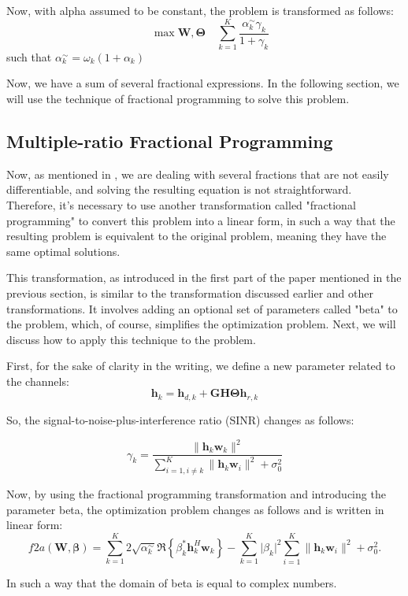 \documentclass{article}
\begin{document}
Now, with alpha assumed to be constant, the problem is 
transformed as follows:
\[
\quad \max \mathbf{W}, \boldsymbol{\Theta} \quad \sum_{k=1}^{K} \frac{\alpha_k^\sim \gamma_k}{1 + \gamma_k}
\]
such that $\alpha_k^\sim = \omega_k(1 + \alpha_k)$

Now, we have a sum of several fractional expressions. In the following section, we will use the technique of fractional programming to solve this problem.

\subsection{Multiple-ratio Fractional Programming}
Now, as mentioned in \cite{12}, we are dealing with several fractions that are not easily differentiable, and solving the resulting equation is not straightforward. Therefore, it's necessary to use another transformation called "fractional programming" to convert this problem into a linear form, in such a way that the resulting problem is equivalent to the original problem, meaning they have the same optimal solutions.

This transformation, as introduced in the first part of the paper mentioned in the previous section, is similar to the transformation discussed earlier and other transformations. It involves adding an optional set of parameters called "beta" to the problem, which, of course, simplifies the optimization problem.
Next, we will discuss how to apply this technique to the problem.

First, for the sake of clarity in the writing, we define a new parameter related to the channels:
\[\mathbf{h}_k = \mathbf{h}_{d,k} + \mathbf{GH}\boldsymbol{\Theta}\mathbf{h}_{r,k}\]

So, the signal-to-noise-plus-interference ratio (SINR) changes as follows:

\[
\gamma_k = \frac{{\lVert \mathbf{h}_k \mathbf{w}_k \rVert^2}}{{\sum_{i=1,i\neq k}^{K} \lVert \mathbf{h}_k \mathbf{w}_i \rVert^2 + \sigma_0^2}}
\]

Now, by using the fractional programming transformation and introducing the parameter beta, the optimization problem changes as follows and is written in linear form:
\[
f2a(\mathbf{W}, \boldsymbol{\beta}) = \sum_{k=1}^{K} 2 \sqrt{\alpha_k^\sim} \Re \left\{ \beta_k^* \mathbf{h}_k^H \mathbf{w}_k \right\} - \sum_{k=1}^{K} \lvert \beta_k \rvert^2 \sum_{i=1}^{K} \lVert \mathbf{h}_k \mathbf{w}_i \rVert^2 + \sigma_0^2.
\]

In such a way that the domain of beta is equal to complex numbers.
\end{document}
